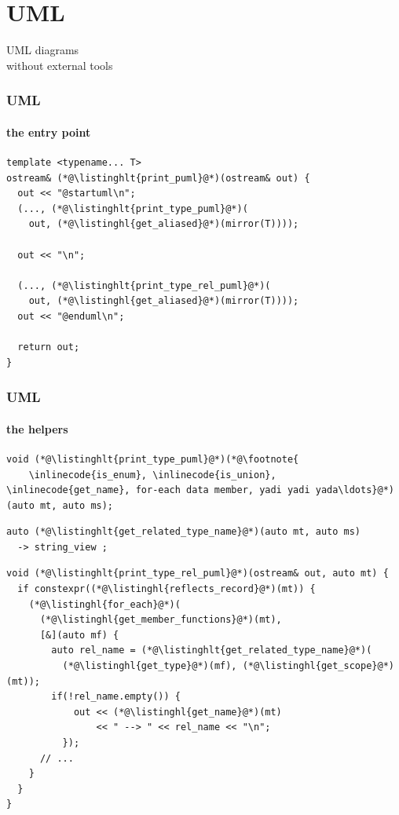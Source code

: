 \documentclass[compress,table,xcolor=table]{beamer}
\begin{document}
\section{UML}
\begin{frame}[c]
  \Huge
  \centering
  UML diagrams\\
  \Large
  without external tools
\end{frame}
\begin{frame}[fragile]
  \frametitle{UML}
  \framesubtitle{the entry point}
  \begin{lstlisting}[language=c++2x,basicstyle=\normalsize\ttfamily]
template <typename... T>
ostream& (*@\listinghlt{print_puml}@*)(ostream& out) {
  out << "@startuml\n";
  (..., (*@\listinghlt{print_type_puml}@*)(
    out, (*@\listinghl{get_aliased}@*)(mirror(T))));

  out << "\n";

  (..., (*@\listinghlt{print_type_rel_puml}@*)(
    out, (*@\listinghl{get_aliased}@*)(mirror(T))));
  out << "@enduml\n";

  return out;
}
  \end{lstlisting}
\end{frame}
\begin{frame}[fragile]
  \frametitle{UML}
  \framesubtitle{the helpers}
  \begin{lstlisting}[language=c++2x,basicstyle=\scriptsize\ttfamily]
void (*@\listinghlt{print_type_puml}@*)(*@\footnote{
    \inlinecode{is_enum}, \inlinecode{is_union}, \inlinecode{get_name}, for-each data member, yadi yadi yada\ldots}@*)(auto mt, auto ms);
  \end{lstlisting}
  \begin{lstlisting}[language=c++2x,basicstyle=\scriptsize\ttfamily]
auto (*@\listinghlt{get_related_type_name}@*)(auto mt, auto ms)
  -> string_view ;
  \end{lstlisting}
  \begin{lstlisting}[language=c++2x,basicstyle=\scriptsize\ttfamily]
void (*@\listinghlt{print_type_rel_puml}@*)(ostream& out, auto mt) {
  if constexpr((*@\listinghl{reflects_record}@*)(mt)) {
    (*@\listinghl{for_each}@*)(
      (*@\listinghl{get_member_functions}@*)(mt),
      [&](auto mf) {
        auto rel_name = (*@\listinghlt{get_related_type_name}@*)(
          (*@\listinghl{get_type}@*)(mf), (*@\listinghl{get_scope}@*)(mt));
        if(!rel_name.empty()) {
            out << (*@\listinghl{get_name}@*)(mt)
                << " --> " << rel_name << "\n";
          });
      // ... 
    }
  }
}
  \end{lstlisting}
\end{frame}
\end{document}
